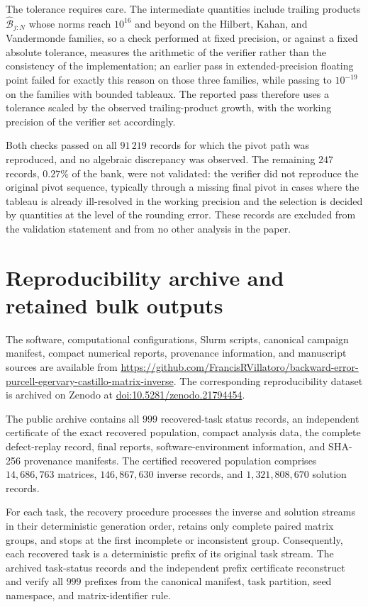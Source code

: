 \documentclass[supplement,review,onefignum,onetabnum]{siamart251216}
\begin{document}
The tolerance requires care. The intermediate quantities include trailing
products $\widehat{\mathcal B}_{j:N}$ whose norms reach $10^{16}$ and beyond on
the Hilbert, Kahan, and Vandermonde families, so a check performed at fixed
precision, or against a fixed absolute tolerance, measures the arithmetic of the
verifier rather than the consistency of the implementation; an earlier pass in
extended-precision floating point failed for exactly this reason on those three
families, while passing to $10^{-19}$ on the families with bounded tableaux.
The reported pass therefore uses a tolerance scaled by the observed
trailing-product growth, with the working precision of the verifier set
accordingly.

Both checks passed on all $91\,219$ records for which the pivot path was
reproduced, and no algebraic discrepancy was observed. The remaining $247$
records, $0.27\%$ of the bank, were not validated: the verifier did not
reproduce the original pivot sequence, typically through a missing final pivot
in cases where the tableau is already ill-resolved in the working precision and
the selection is decided by quantities at the level of the rounding error. These
records are excluded from the validation statement and from no other analysis in
the paper.

\section{Reproducibility archive and retained bulk outputs}
\label{sec:reproducibility_archive}

The software, computational configurations, Slurm scripts, canonical campaign
manifest, compact numerical reports, provenance information, and manuscript
sources are available from
\url{https://github.com/FrancisRVillatoro/backward-error-purcell-egervary-castillo-matrix-inverse}.
The corresponding reproducibility dataset is archived on Zenodo at
\href{https://doi.org/10.5281/zenodo.21794454}
{doi:10.5281/zenodo.21794454}.

The public archive contains all $999$ recovered-task status records, an
independent certificate of the exact recovered population, compact analysis
data, the complete defect-replay record, final reports,
software-environment information, and SHA-256 provenance manifests. The
certified recovered population comprises $14{,}686{,}763$ matrices,
$146{,}867{,}630$ inverse records, and $1{,}321{,}808{,}670$ solution
records.

For each task, the recovery procedure processes the inverse and solution
streams in their deterministic generation order, retains only complete paired
matrix groups, and stops at the first incomplete or inconsistent group.
Consequently, each recovered task is a deterministic prefix of its original
task stream. The archived task-status records and the independent prefix
certificate reconstruct and verify all $999$ prefixes from the canonical
manifest, task partition, seed namespace, and matrix-identifier rule.
\end{document}

